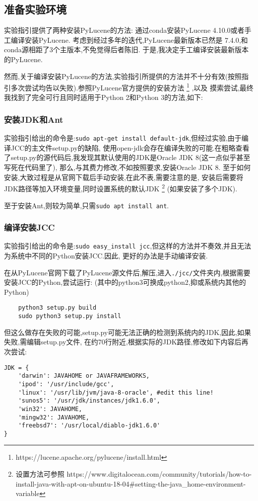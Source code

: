 \documentclass[a4paper]{article}
\begin{document}
        \subsection{准备实验环境}
实验指引提供了两种安装PyLucene的方法: 通过conda安装PyLucene 4.10.0或者手工编译安装PyLucene. 考虑到经过多年的迭代,PyLucene最新版本已然是
7.4.0,和conda源相距了3个主版本,不免觉得后者陈旧. 于是,我决定手工编译安装最新版本的PyLucene.

然而,关于编译安装PyLucene的方法,实验指引所提供的方法并不十分有效(按照指引多次尝试均告以失败).参照PyLucene官方提供的安装方法
\footnote{https://lucene.apache.org/pylucene/install.html}
,以及
摸索尝试,最终我找到了完全可行且同时适用于Python 2和Python 3的方法,如下:
            \subsubsection{安装JDK和Ant}
实验指引给出的命令是:\texttt{sudo apt-get install default-jdk},但经过实验,由于编译JCC的主文件setup.py的缺陷,
使用open-jdk会存在编译失败的可能.在粗略查看了setup.py的源代码后,我发现其默认使用的JDK是Oracle JDK 8(这一点似乎甚至写死在代码里了),
那么,与其费力修改,不如按照要求,安装Oracle JDK 8. 至于如何安装,大致过程是从官网下载后手动安装,在此不表,需要注意的是,
安装后需要将JDK路径等加入环境变量,同时设置系统的默认JDK
\footnote{设置方法可参照 https://www.digitalocean.com/community/tutorials/how-to-install-java-with-apt-on-ubuntu-18-04\#setting-the-java\_home-environment-variable}
(如果安装了多个JDK).

至于安装Ant,则较为简单,只需\texttt{sudo apt install ant}.

            \subsubsection{编译安装JCC}
实验指引给出的命令是:\texttt{sudo easy_install jcc},但这样的方法并不奏效,并且无法为系统中不同的Python安装JCC.因此,
更好的办法是手动编译安装.

在从PyLucene官网下载了PyLucene源文件后,解压,进入\texttt{./jcc/}文件夹内,根据需要安装JCC的Python,尝试运行:
(其中的python3可换成python2,抑或系统内其他的Python)
\begin{verbatim}
    python3 setup.py build
    sudo python3 setup.py install
\end{verbatim}

但这么做存在失败的可能,setup.py可能无法正确的检测到系统内的JDK,因此,如果失败,需编辑setup.py文件,
在约70行附近,根据实际的JDK路径,修改如下内容后再次尝试:
\begin{verbatim}
JDK = {
    'darwin': JAVAHOME or JAVAFRAMEWORKS,
    'ipod': '/usr/include/gcc',
    'linux': '/usr/lib/jvm/java-8-oracle', #edit this line!
    'sunos5': '/usr/jdk/instances/jdk1.6.0',
    'win32': JAVAHOME,
    'mingw32': JAVAHOME,
    'freebsd7': '/usr/local/diablo-jdk1.6.0'
}
\end{verbatim}
\end{document}
